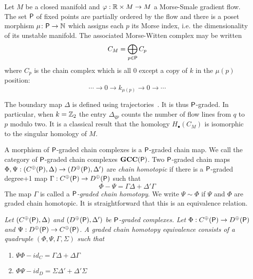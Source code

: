\begin{ex}
Let $M$ be a closed manifold and $\varphi:{\mathbb{R}}\times M\to M$ a Morse-Smale gradient flow.  The set ${\mathsf P}$ of fixed points are partially ordered by the flow and there is a poset morphism $\mu\colon {\mathsf P}\to {\mathbb{N}}$ which assigns each $p$ its Morse index, i.e. the dimensionality of its unstable manifold.   The associated Morse-Witten complex may be written $$C_M = \bigoplus_{p\in {\mathsf P}} C_p$$ where $C_p$ is the chain complex which is all $0$ except a copy of $k$ in the $\mu(p)$ position: $$\cdots \to 0 \to k_{\mu(p)}\to 0\to \cdots$$

The boundary map $\Delta$ is defined using trajectories~\cite{robbin:salamon2, witten}.  It is thus ${\mathsf P}$-graded. In particular, when $k={\mathbb{Z}}_2$ the entry $\Delta_{qp}$ counts the number of flow lines from $q$ to $p$ modulo two.  It is a classical result that the homology $H_\bullet(C_M)$ is isomorphic to the singular homology of $M$.
\end{ex}


A morphism of ${\mathsf P}$-graded chain complexes is a ${\mathsf P}$-graded chain map.   We call the category of ${\mathsf P}$-graded chain complexes $\bf{GCC({\mathsf P})}$.   Two ${\mathsf P}$-graded chain maps $\Phi,\Psi:(C^\oplus({\mathsf P}),\Delta)\to (D^\oplus({\mathsf P}),\Delta')$ are {\em chain homotopic} if there  is a ${\mathsf P}$-graded degree+1 map $\Gamma:C^\oplus({\mathsf P})\to D^\oplus({\mathsf P})$ such that 
\[
\Phi-\Psi = \Gamma\Delta + \Delta'\Gamma
\]
 The map $\Gamma$ is called a {\em ${\mathsf P}$-graded chain homotopy}.  We write $\Psi\sim \Phi$ if $\Psi$ and $\Phi$ are graded chain homotopic.  It is straightforward that this is an equivalence relation.
 
 \begin{defn}
 {\em
Let $(C^\oplus({\mathsf P}),\Delta)$ and $(D^\oplus({\mathsf P}),\Delta')$ be ${\mathsf P}$-graded complexes.  Let $\Phi:C^\oplus({\mathsf P})\to D^\oplus({\mathsf P})$ and $\Psi:D^\oplus({\mathsf P})\to C^\oplus({\mathsf P})$.  A {\em graded chain homotopy equivalence} consists of a quadruple $(\Phi,\Psi,\Gamma,\Sigma)$ such that
\begin{enumerate}
\item $\Psi\Phi - id_C = \Gamma\Delta + \Delta \Gamma$
\item $\Phi\Psi - id_D = \Sigma\Delta' + \Delta'\Sigma$
\end{enumerate}
}
 \end{defn}
 
